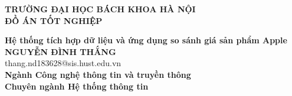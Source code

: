 \documentclass[DoAn.tex]{subfiles}
\begin{document}
\begin{titlepage}
\thispagestyle{empty}
\begin{center}

{\textbf{\large{TRƯỜNG ĐẠI HỌC BÁCH KHOA HÀ NỘI}}}\\[3.5cm]

{\textbf{\huge{ ĐỒ ÁN TỐT NGHIỆP}}}\\[1cm]
{\textbf{\Large{Hệ thống tích hợp dữ liệu và ứng dụng so sánh giá sản phẩm Apple}}\\[1cm]

{\textbf{\large{NGUYỄN ĐÌNH THẮNG}}}\\
{\large{thang.nd183628@sis.hust.edu.vn}}\\[0.5cm]

{\textbf{\large{Ngành Công nghệ thông tin và truyền thông}}}\\
{\textbf{\large{Chuyên ngành Hệ thống thông tin}}}\\

\vspace{2cm}
\begin{table}[H]
\centering
{}
\end{table}}
\end{center}



\end{titlepage}
\end{document}
